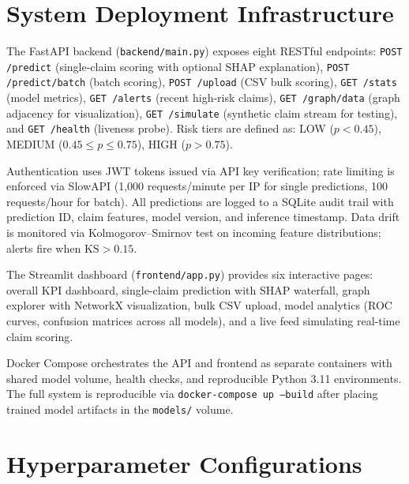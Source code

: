 \documentclass[pdflatex,sn-mathphys-num]{sn-jnl}
\theoremstyle{thmstyleone}
\theoremstyle{thmstyletwo}
\theoremstyle{thmstylethree}
\begin{document}
\begin{appendices}

\section{System Deployment Infrastructure}\label{app:deployment}

The FastAPI backend (\texttt{backend/main.py}) exposes eight RESTful
endpoints: \texttt{POST /predict} (single-claim scoring with optional
SHAP explanation), \texttt{POST /predict/batch} (batch scoring),
\texttt{POST /upload} (CSV bulk scoring), \texttt{GET /stats} (model
metrics), \texttt{GET /alerts} (recent high-risk claims), \texttt{GET
/graph/data} (graph adjacency for visualization), \texttt{GET
/simulate} (synthetic claim stream for testing), and \texttt{GET
/health} (liveness probe). Risk tiers are defined as: LOW ($p < 0.45$),
MEDIUM ($0.45 \leq p \leq 0.75$), HIGH ($p > 0.75$).

Authentication uses JWT tokens issued via API key verification; rate
limiting is enforced via SlowAPI (1,000 requests/minute per IP for
single predictions, 100 requests/hour for batch). All predictions are
logged to a SQLite audit trail with prediction ID, claim features,
model version, and inference timestamp. Data drift is monitored via
Kolmogorov--Smirnov test on incoming feature distributions; alerts fire
when $\mathrm{KS} > 0.15$.

The Streamlit dashboard (\texttt{frontend/app.py}) provides six
interactive pages: overall KPI dashboard, single-claim prediction with
SHAP waterfall, graph explorer with NetworkX visualization, bulk CSV
upload, model analytics (ROC curves, confusion matrices across all
models), and a live feed simulating real-time claim scoring.

Docker Compose orchestrates the API and frontend as separate containers
with shared model volume, health checks, and reproducible Python 3.11
environments. The full system is reproducible via \texttt{docker-compose
up --build} after placing trained model artifacts in the
\texttt{models/} volume.

\section{Hyperparameter Configurations}\label{app:hyperparams}


\end{appendices}
\end{document}
